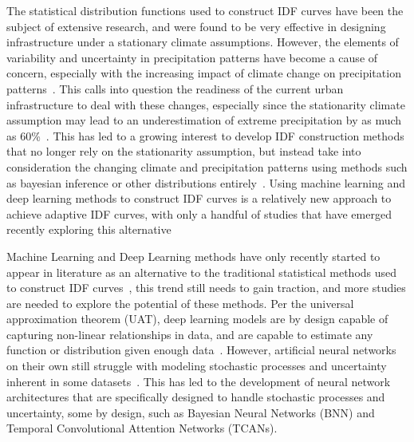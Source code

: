 The statistical distribution functions used to construct IDF curves have been the subject of extensive research, and were found to be very effective in designing infrastructure under a stationary climate assumptions. However, the elements of variability and uncertainty in precipitation patterns have become a cause of concern, especially with the increasing impact of climate change on precipitation patterns~\cite{Cheng2014}. This calls into question the readiness of the current urban infrastructure to deal with these changes, especially since the stationarity climate assumption may lead to an underestimation of extreme precipitation by as much as 60\%~\cite{Cheng2014}. This has led to a growing interest to develop IDF construction methods that no longer rely on the stationarity assumption, but instead take into consideration the changing climate and precipitation patterns using methods such as bayesian inference or other distributions entirely~\cite{Cheng2014, hess-2020-173, hess-27-2075-2023, hess-25-6133-2021}. Using machine learning and deep learning methods to construct IDF curves is a relatively new approach to achieve adaptive IDF curves, with only a handful of studies that have emerged recently exploring this alternative~\cite{idfkoya}

\vspace{1em}

Machine Learning and Deep Learning methods have only recently started to appear in literature as an alternative to the traditional statistical methods used to construct IDF curves~\cite{idfkoya}, this trend still needs to gain traction, and more studies are needed to explore the potential of these methods. Per the universal approximation theorem (UAT), deep learning models are by design capable of capturing non-linear relationships in data, and are capable to estimate any function or distribution given enough data~\cite{Goodfellow2016-sect6.4.1}. However, artificial neural networks on their own still struggle with modeling stochastic processes and uncertainty inherent in some datasets~\cite{thacker2020fundamentalissuesregardinguncertainties}. This has led to the development of neural network architectures that are specifically designed to handle stochastic processes and uncertainty, some by design, such as Bayesian Neural Networks (BNN) and Temporal Convolutional Attention Networks (TCANs).~\cite{lin2021tcan, goan2020} 

\vspace{1em}

